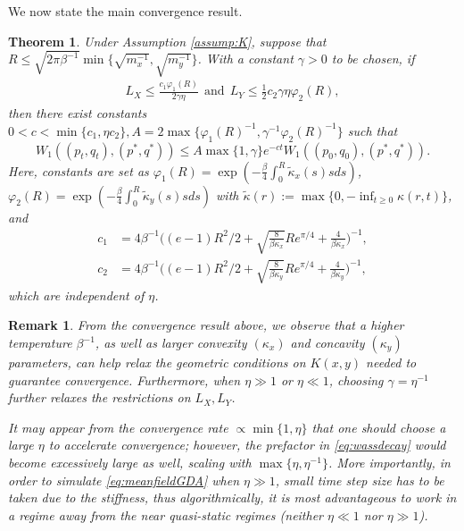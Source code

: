 \documentclass[11pt]{article}
\newtheorem{thm}{Theorem}[section]
\newtheorem{remark}[theorem]{Remark}
\newcommand{\1}{\mathds{1}}
\begin{document}
We now state the main convergence result.
\begin{thm}\label{thm:convbycoupling}
     Under Assumption \ref{assump:K}, suppose that $R\leq \sqrt{2\pi\beta^{-1}}\min\big\{\sqrt{m_x^{-1}},\sqrt{m_y^{-1}}\big\}$. With a constant $\gamma>0$ to be chosen, if
    \begin{equation*}
        \begin{aligned}
            L_X\leq \frac{c_1\varphi_1(R)}{2\gamma \eta }~~\text{and}~~
            L_Y\leq \frac{1}{2}c_2\gamma\eta \varphi_2(R) ,
        \end{aligned}
    \end{equation*}
 then there exist constants $0<c< \min\{c_1, \eta c_2\}, A=2\max\{\varphi_1(R)^{-1}, \gamma^{-1}\varphi_2(R)^{-1}\}$ such that
 \begin{equation}\label{eq:wassdecay}
     W_1((p_t,q_t), (p^*, q^*))\leq A\max\{1,\gamma\}e^{-ct} W_1((p_0,q_0), (p^*, q^*)).
 \end{equation}
Here, constants are set as $\varphi_1(R) = \exp(-\frac{\beta}{4}\int_0^R \tilde{\kappa}_x(s)sds)$, $\varphi_2(R) = \exp(-\frac{\beta}{4}\int_0^R \tilde{\kappa}_y(s)sds)$ with  $\tilde{\kappa}(r) := \max\{0, -\inf_{t\geq0}\kappa(r,t)\}$, and
     \begin{equation*}
        \begin{aligned}
             c_1 &= 4\beta^{-1} \Big((e-1)R^2/2 + \sqrt{\frac{8}{\beta \kappa_x}}Re^{\pi/4}+ \frac{4}{\beta \kappa_x}\Big)^{-1},\\
            c_2 &= 4\beta^{-1} \Big((e-1)R^2/2 + \sqrt{\frac{8}{\beta \kappa_y}}Re^{\pi/4}+ \frac{4}{\beta \kappa_y}\Big)^{-1},
        \end{aligned}
    \end{equation*}
    which are independent of $\eta$. 
\end{thm}
\begin{remark}
From the convergence result above, we observe that a higher temperature $\beta^{-1}$, as well as larger convexity $(\kappa_x)$ and concavity $(\kappa_y)$ parameters, can help relax the geometric conditions on $K(x,y)$ needed to guarantee convergence. Furthermore, when $\eta\gg 1$ or $\eta\ll 1$, choosing $\gamma = \eta^{-1}$ further relaxes the restrictions on $L_X, L_Y$.

It may appear from the convergence rate $\propto \min\{1, \eta\}$ that one should choose a large $\eta$ to accelerate convergence; however, the prefactor in \eqref{eq:wassdecay} would become excessively large as well, scaling with $\max\{\eta, \eta^{-1}\}$. More importantly, in order to simulate \eqref{eq:meanfieldGDA} when $\eta \gg 1$, small time step size has to be taken due to the stiffness, thus algorithmically, it is most advantageous to work in a regime away from the near quasi-static regimes (neither $\eta \ll 1$ nor $\eta \gg 1$). 
\end{remark}
\end{document}
